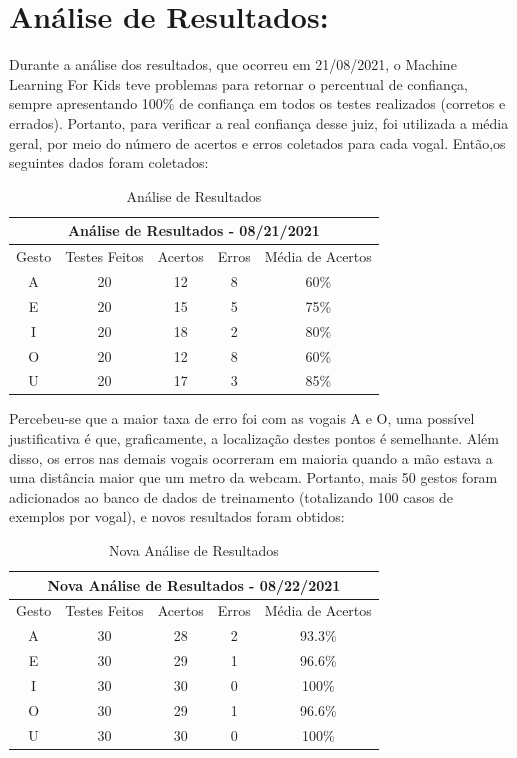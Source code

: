 \documentclass[a4paper, 12pt]{article}
\begin{document}
\section{Análise de Resultados:}

Durante a análise dos resultados, que ocorreu em 21/08/2021, o Machine Learning For Kids teve problemas para retornar o percentual de confiança, sempre apresentando 100\% de confiança em todos os testes realizados (corretos e errados). Portanto, para verificar a real confiança desse juiz, foi utilizada a média geral, por meio do número de acertos e erros coletados para cada vogal. Então,os seguintes dados foram coletados:


\begin{table}[h!]
    \centering
    \begin{tabular}{ |c|c|c|c|c| } 
    \hline
    \multicolumn{5}{|c|}{Análise de Resultados - 08/21/2021} \\
    \hline
    Gesto & Testes Feitos & Acertos & Erros & Média de Acertos \\
    \hline
    A & 20 & 12 & 8 & 60\% \\ 
    \hline
    E & 20 & 15 & 5 & 75\% \\
    \hline
    I & 20 & 18 & 2 & 80\% \\
    \hline
    O & 20 & 12 & 8 & 60\% \\
    \hline
    U & 20 & 17 & 3 & 85\% \\
    \hline
    \end{tabular}
    \caption{Análise de Resultados}
    \label{tab:results_analysis}
\end{table}

Percebeu-se que a maior taxa de erro foi com as vogais A e O, uma possível justificativa é que, graficamente, a localização destes pontos é semelhante. Além disso, os erros nas demais vogais ocorreram em maioria quando a mão estava a uma distância maior que um metro da webcam. Portanto, mais 50 gestos foram adicionados ao banco de dados de treinamento (totalizando 100 casos de exemplos por vogal), e novos resultados foram obtidos:

\begin{table}[h!]
    \centering
    \begin{tabular}{ |c|c|c|c|c| } 
    \hline
    \multicolumn{5}{|c|}{Nova Análise de Resultados - 08/22/2021} \\
    \hline
    Gesto & Testes Feitos & Acertos & Erros & Média de Acertos \\
    \hline
    A & 30 & 28 & 2 & 93.3\% \\ 
    \hline
    E & 30 & 29 & 1 & 96.6\% \\
    \hline
    I & 30 & 30 & 0 & 100\% \\
    \hline
    O & 30 & 29 & 1 & 96.6\% \\
    \hline
    U & 30 & 30 & 0 & 100\% \\
    \hline
    \end{tabular}
    \caption{Nova Análise de Resultados}
    \label{tab:results_analysis2}
\end{table}
\end{document}
